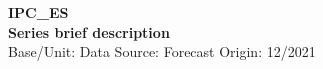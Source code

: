 \documentclass[a4paper,12pt]{article}
\begin{document}
\thispagestyle{empty}
\begin{landscape}
\begin{center}

\textbf{IPC_ES} \\ 

\textbf{Series brief description} \\ 

Base/Unit: 
\space \space \space Data Source:  
\space \space \space Forecast Origin: 12/2021 \\ 
\end{center}

\begin{small}   \end{small} 

\end{landscape}
\end{document}

